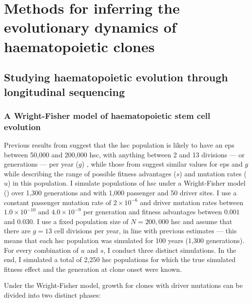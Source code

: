 \chapter{Methods for inferring the evolutionary dynamics of haematopoietic clones}

\section{Studying haematopoietic evolution through longitudinal sequencing}

\subsection{A Wright-Fisher model of haematopoietic stem cell evolution}

Previous results from  suggest that the \ac{hsc} population is likely to have an \ac{eps} between 50,000 and 200,000 \ac{hsc}, with anything between 2 and 13 divisions --- or generations --- per year ($g$) \cite{Lee-Six2018-lp}, while those from  suggest similar values for \ac{eps} and $g$ while describing the range of possible fitness advantages ($s$) and mutation rates ($u$) in this population. I simulate populations of \ac{hsc} under a Wright-Fisher model () \cite{Beerenwinkel_undated-up} over 1,300 generations and with 1,000 passenger and 50 driver sites. I use a constant passenger mutation rate of $2 \times 10^{-6}$ and driver mutation rates between $1.0 \times 10^{-10}$ and $4.0 \times 10^{-9}$ per generation and fitness advantages between $0.001$ and $0.030$. I use a fixed population size of $N=200,000$ \ac{hsc} and assume that there are $g=13$ cell divisions per year, in line with previous estimates \cite{Lee-Six2018-lp,Watson2020-pz} --- this means that each \ac{hsc} population was simulated for 100 years (1,300 generations). For every combination of $u$ and $s$, I conduct three distinct simulations. In the end, I simulated a total of 2,250 \ac{hsc} populations for which the true simulated fitness effect and the generation at clone onset were known. 

\begin{figure}[!ht]
	\label{fig:wf-example}
\end{figure}

Under the Wright-Fisher model, growth for clones with driver mutations can be divided into two distinct phases:

